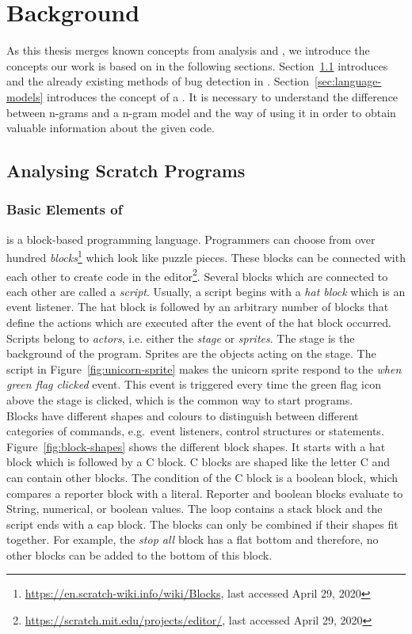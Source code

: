 \chapter{Background}\label{chap:background}
As this thesis merges known concepts from \scratch{} analysis and \ngram{}, we introduce the concepts our work is based on in the following sections. Section~\ref{sec:analysing-scratch} introduces \scratch{} and the already existing methods of bug detection in \scratch. Section~\ref{sec:language-models} introduces the concept of a \ngram{}. It is necessary to understand the difference between n-grams and a n-gram model and the way of using it in order to obtain valuable information about the given code.


\section{Analysing Scratch Programs}\label{sec:analysing-scratch}

\subsection{Basic Elements of \scratch}\label{subsec:scratch}
\scratch{} is a block-based programming language.
Programmers can choose from over hundred \textit{blocks}\footnote{\url{https://en.scratch-wiki.info/wiki/Blocks}, last accessed April 29, 2020} which look like puzzle pieces. These blocks can be connected with each other to create \scratch{} code in the \scratch{} editor\footnote{\url{https://scratch.mit.edu/projects/editor/}, last accessed April 29, 2020}. Several blocks which are connected to each other are called a \textit{script}. Usually, a script begins with a \textit{hat block} which is an event listener. The hat block is followed by an arbitrary number of blocks that define the actions which are executed after the event of the hat block occurred. Scripts belong to \textit{actors}, i.e. either the \textit{stage} or \textit{sprites}. The stage is the background of the program. Sprites are the objects acting on the stage. The script in Figure~\ref{fig:unicorn-sprite} makes the unicorn sprite respond to the \textit{when green flag clicked} event. This event is triggered every time the green flag icon above the stage is
clicked, which is the common way to start \scratch{} programs.\\ 
Blocks have different shapes and colours to distinguish between different categories of commands, e.g.\ event listeners, control structures or statements. Figure~\ref{fig:block-shapes} shows the different block shapes. It starts with a hat block which is followed by a C block. C blocks are shaped like the letter C and can contain other blocks. The condition of the C block is a boolean block, which compares a reporter block with a literal. Reporter and boolean blocks evaluate to String, numerical, or boolean values. The loop contains a stack block and the script ends with a cap block. The blocks can only be combined if their shapes fit together. For example, the \textit{stop all} block has a flat bottom and therefore, no other blocks can be added to the bottom of this block.

